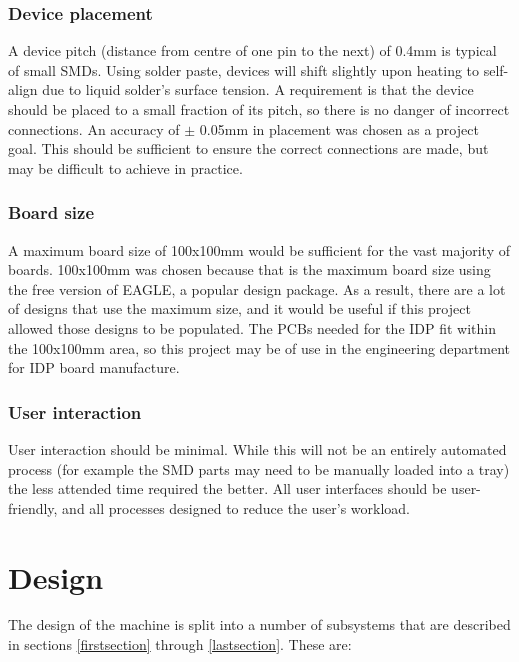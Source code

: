 \subsubsection{Device placement}
\label{devplacement}
A device pitch (distance from centre of one pin to the next) of 0.4mm is typical of small SMDs. Using solder paste,
devices will shift slightly upon heating to self-align due to liquid solder's surface tension. A requirement is that the device should be placed to a
small fraction of its pitch, so there is no danger of incorrect connections. An accuracy of $\pm$ 0.05mm
in placement was chosen as a project goal. This should be sufficient to ensure the correct connections are made, but may be difficult to achieve in practice.

\subsubsection{Board size}
A maximum board size of 100x100mm would be sufficient for the vast majority of boards. 100x100mm was chosen because that
is the maximum board size using the free version of EAGLE, a popular design package. As a result, there are a lot of designs
that use the maximum size, and it would be useful if this project allowed those designs to be populated.
The PCBs needed for the IDP fit within the 100x100mm area, so this project
may be of use in the engineering department for IDP board manufacture.

\subsubsection{User interaction}
User interaction should be minimal. While this will not be an entirely 
automated process (for example the SMD parts may need to be manually loaded
into a tray) the less attended time required the better. All user
interfaces should be user-friendly, and all processes designed to reduce
the user's workload.




\section{Design}

The design of the machine is split into a number of subsystems that are
described in sections \ref{firstsection} through \ref{lastsection}. These
are:

